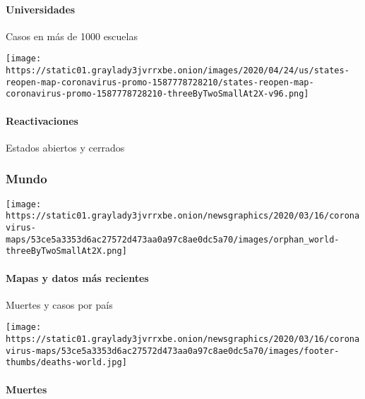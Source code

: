 \hypertarget{universidades}{%
\paragraph{Universidades}\label{universidades}}

Casos en más de 1000 escuelas

\href{https://www.nytimes3xbfgragh.onion/interactive/2020/us/states-reopen-map-coronavirus.html}{}

\texttt{[image: https://static01.graylady3jvrrxbe.onion/images/2020/04/24/us/states-reopen-map-coronavirus-promo-1587778728210/states-reopen-map-coronavirus-promo-1587778728210-threeByTwoSmallAt2X-v96.png]}

\hypertarget{reactivaciones}{%
\paragraph{Reactivaciones}\label{reactivaciones}}

Estados abiertos y cerrados

\hypertarget{mundo}{%
\subsubsection{Mundo}\label{mundo}}

\href{https://www.nytimes3xbfgragh.onion/interactive/2020/world/coronavirus-maps.html}{}

\texttt{[image: https://static01.graylady3jvrrxbe.onion/newsgraphics/2020/03/16/coronavirus-maps/53ce5a3353d6ac27572d473aa0a97c8ae0dc5a70/images/orphan\_world-threeByTwoSmallAt2X.png]}

\hypertarget{mapas-y-datos-muxe1s-recientes-1}{%
\paragraph{Mapas y datos más
recientes}\label{mapas-y-datos-muxe1s-recientes-1}}

Muertes y casos por país

\href{https://www.nytimes3xbfgragh.onion/interactive/2020/04/21/world/coronavirus-missing-deaths.html}{}

\texttt{[image: https://static01.graylady3jvrrxbe.onion/newsgraphics/2020/03/16/coronavirus-maps/53ce5a3353d6ac27572d473aa0a97c8ae0dc5a70/images/footer-thumbs/deaths-world.jpg]}

\hypertarget{muertes-1}{%
\paragraph{Muertes}\label{muertes-1}}

